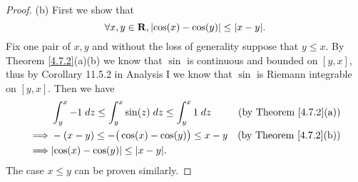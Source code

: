 \begin{proof}{(b)}
    First we show that
    \[
        \forall x, y \in \R, \abs{\cos(x) - \cos(y)} \leq \abs{x - y}.
    \]
    Fix one pair of \(x, y\) and without the loss of generality suppose that \(y \leq x\).
    By Theorem \ref{4.7.2}(a)(b) we know that \(\sin\) is continuous and bounded on \([y, x]\), thus by Corollary 11.5.2 in Analysis I we know that \(\sin\) is Riemann integrable on \([y, x]\).
    Then we have
    \begin{align*}
                 & \int_y^x -1 \; dz \leq \int_y^x \sin(z) \; dz \leq \int_y^x 1 \; dz & \text{(by Theorem \ref{4.7.2}(a))} \\
        \implies & -(x - y) \leq -\big(\cos(x) - \cos(y)\big) \leq x - y               & \text{(by Theorem \ref{4.7.2}(b))} \\
        \implies & \abs{\cos(x) - \cos(y)} \leq \abs{x - y}.
    \end{align*}
    The case \(x \leq y\) can be proven similarly.


\end{proof}
